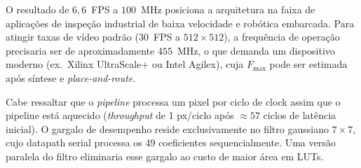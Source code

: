 O resultado de $6{,}6$~FPS a $100$~MHz posiciona a arquitetura na faixa de aplicações
de inspeção industrial de baixa velocidade e robótica embarcada. Para atingir taxas de
vídeo padrão ($30$~FPS a $512\times512$), a frequência de operação precisaria ser de
aproximadamente $455$~MHz, o que demanda um dispositivo moderno (ex.\ Xilinx UltraScale+
ou Intel Agilex), cuja $F_\text{max}$ pode ser estimada após síntese e \textit{place-and-route}.

Cabe ressaltar que o \textit{pipeline} processa um pixel por ciclo de clock assim que o
pipeline está aquecido (\textit{throughput} de 1 px/ciclo após $\approx 57$ ciclos de
latência inicial). O gargalo de desempenho reside exclusivamente no filtro gaussiano
$7\times7$, cujo datapath serial processa os 49 coeficientes sequencialmente.
Uma versão paralela do filtro eliminaria esse gargalo ao custo de maior área em LUTs.

